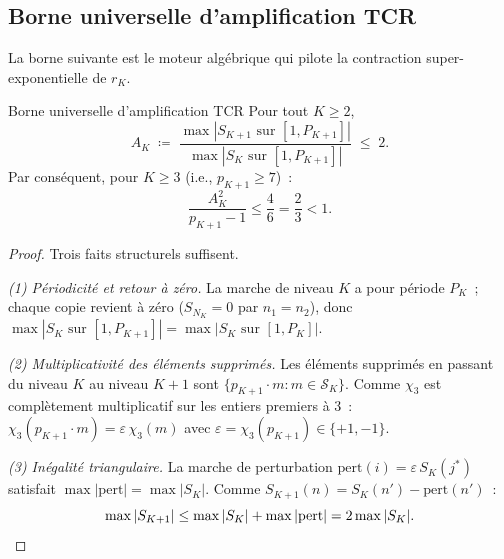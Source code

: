 \documentclass[12pt,a4paper]{article}
\begin{document}
\subsection{Borne universelle d'amplification TCR}
\label{sec:ch7_AK}

La borne suivante est le moteur algébrique qui pilote la contraction
super-exponentielle de $r_K$.

\begin{thmbox}{Borne universelle d'amplification TCR}
\label{thm:crt_amplification}
Pour tout $K \geq 2$,
\begin{equation}
  A_K \;\coloneqq\;
  \frac{\max|S_{K+1} \text{ sur } [1,P_{K+1}]|}
       {\max|S_K \text{ sur } [1,P_{K+1}]|}
  \;\leq\; 2.
  \label{eq:AK_bound}
\end{equation}
Par conséquent, pour $K \geq 3$ (i.e., $p_{K+1} \geq 7$)~:
\begin{equation}
  \frac{A_K^2}{p_{K+1}-1} \leq \frac{4}{6} = \frac{2}{3} < 1.
  \label{eq:AK_contraction}
\end{equation}

\begin{proof}
Trois faits structurels suffisent.

\emph{(1) Périodicité et retour à zéro.}
La marche de niveau $K$ a pour période $P_K$~; chaque copie revient
à zéro ($S_{N_K} = 0$ par $n_1 = n_2$), donc
$\max|S_K \text{ sur } [1,P_{K+1}]| = \max|S_K \text{ sur } [1,P_K]|$.

\emph{(2) Multiplicativité des éléments supprimés.}
Les éléments supprimés en passant du niveau $K$ au niveau $K{+}1$ sont
$\{p_{K+1}\cdot m : m \in \mathcal{S}_K\}$.
Comme $\chi_3$ est complètement multiplicatif sur les entiers premiers
à $3$~: $\chi_3(p_{K+1}\cdot m) = \varepsilon\,\chi_3(m)$ avec
$\varepsilon = \chi_3(p_{K+1}) \in \{+1,-1\}$.

\emph{(3) Inégalité triangulaire.}
La marche de perturbation $\mathrm{pert}(i) = \varepsilon\,S_K(j^*)$
satisfait $\max|\mathrm{pert}| = \max|S_K|$.
Comme $S_{K+1}(n) = S_K(n') - \mathrm{pert}(n')$~:
\[
  \max|S_{K+1}| \leq \max|S_K| + \max|\mathrm{pert}| = 2\max|S_K|.
  \qedhere
\]
\end{proof}
\end{thmbox}
\end{document}
